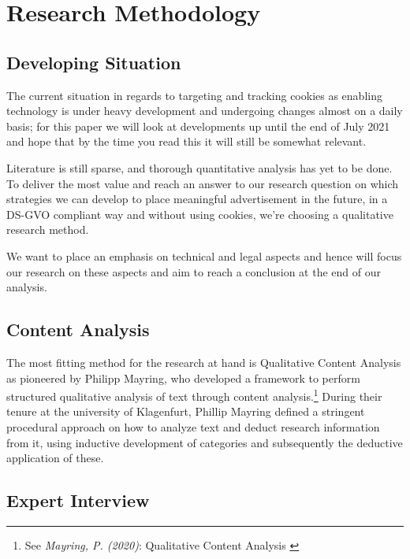 %
%

\pagebreak
\section{Research Methodology}

\onehalfspacing

\subsection{Developing Situation}

The current situation in regards to targeting and tracking cookies as enabling technology is under heavy development and undergoing changes almost on a daily basis; for this paper we will look at developments up until the end of July 2021 and hope that by the time you read this it will still be somewhat relevant.

Literature is still sparse, and thorough quantitative analysis has yet to be done. To deliver the most value and reach an answer to our research question on which strategies we can develop to place meaningful advertisement in the future, in a DS-GVO compliant way and without using cookies, we're choosing a qualitative research method.

We want to place an emphasis on technical and legal aspects and hence will focus our research on these aspects and aim to reach a conclusion at the end of our analysis.

\subsection{Content Analysis}

The most fitting method for the research at hand is Qualitative Content Analysis as pioneered by Philipp Mayring, who developed a framework to perform structured qualitative analysis of text through content analysis.\footnote{See \textit{Mayring, P. (2020)}: Qualitative Content Analysis \cite{qualiContent}} During their tenure at the university of Klagenfurt, Phillip Mayring defined a stringent procedural approach on how to analyze text and deduct research information from it, using inductive development of categories and subsequently the deductive application of these.

\subsection{Expert Interview}

